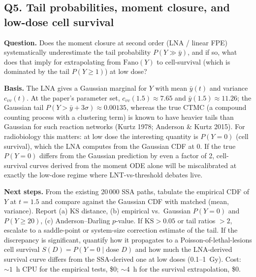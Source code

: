 \subsection*{Q5.  Tail probabilities, moment closure, and low-dose cell survival}

\textbf{Question.}  Does the moment closure at second order (LNA / linear FPE) systematically underestimate the tail probability $P(Y\gg\bar y)$, and if so, what does that imply for extrapolating from $\mathrm{Fano}(Y)$ to cell-survival (which is dominated by the tail $P(Y\ge 1)$) at low dose?

\textbf{Basis.}  The LNA gives a Gaussian marginal for $Y$ with mean $\bar y(t)$ and variance $c_{vv}(t)$.  At the paper's parameter set, $c_{vv}(1.5)\approx 7.65$ and $\bar y(1.5)\approx 11.26$; the Gaussian tail $P(Y>\bar y+3\sigma)\approx 0.00135$, whereas the true CTMC (a compound counting process with a clustering term) is known to have heavier tails than Gaussian for such reaction networks (Kurtz 1978; Anderson \& Kurtz 2015).  For radiobiology this matters: at low dose the interesting quantity is $P(Y=0)$ (cell survival), which the LNA computes from the Gaussian CDF at $0$.  If the true $P(Y=0)$ differs from the Gaussian prediction by even a factor of 2, cell-survival curves derived from the moment ODE alone will be miscalibrated at exactly the low-dose regime where LNT-vs-threshold debates live.

\textbf{Next steps.}  From the existing 20\,000 SSA paths, tabulate the empirical CDF of $Y$ at $t=1.5$ and compare against the Gaussian CDF with matched (mean, variance).  Report (a) KS distance, (b) empirical vs.\ Gaussian $P(Y=0)$ and $P(Y\ge 20)$, (c) Anderson--Darling $p$-value.  If $\mathrm{KS}>0.05$ or tail ratios $>2$, escalate to a saddle-point or system-size correction estimate of the tail.  If the discrepancy is significant, quantify how it propagates to a Poisson-of-lethal-lesions cell survival $S(D)=P(Y=0\mid \text{dose }D)$ and how much the LNA-derived survival curve differs from the SSA-derived one at low doses (0.1--1~Gy).  Cost: $\sim 1$~h CPU for the empirical tests, \$0; $\sim 4$~h for the survival extrapolation, \$0.
